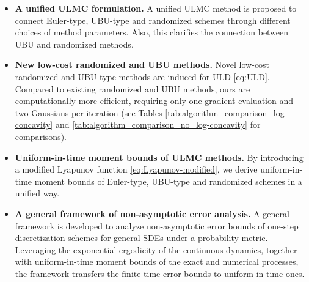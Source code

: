 \documentclass[12pt]{article}
\numberwithin{equation}{section}
\begin{document}
\begin{itemize}
    \item \textbf{A unified ULMC formulation.}
    A unified ULMC method is proposed to connect Euler-type, UBU-type and randomized schemes through different choices of method parameters.
    Also, this clarifies the connection between UBU and randomized methods.
    \item \textbf{New low-cost randomized and UBU methods.}
    Novel low-cost randomized and UBU-type methods are induced for ULD \eqref{eq:ULD}. Compared to existing randomized and UBU methods, ours are computationally more efficient, requiring only one gradient evaluation and two Gaussians per iteration (see Tables \ref{tab:algorithm_comparison_log-concavity} and \ref{tab:algorithm_comparison_no_log-concavity} for comparisons).
    \item \textbf{Uniform-in-time moment bounds of ULMC methods.} By introducing a modified Lyapunov function \eqref{eq:Lyapunov-modified}, we derive uniform-in-time moment bounds of Euler-type, UBU-type and randomized schemes in a unified way.
    \item \textbf{A general framework of non-asymptotic error analysis.}
    A general framework is developed to analyze non-asymptotic error bounds of one-step discretization schemes for general SDEs under a probability metric. Leveraging the exponential ergodicity of the continuous dynamics, together with uniform-in-time moment bounds of the exact and numerical processes, the framework transfers the finite-time error bounds to uniform-in-time ones. 
    

\end{itemize}
\end{document}
